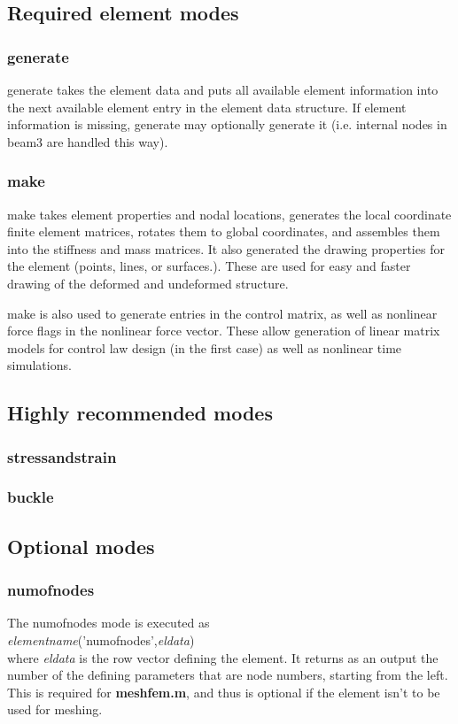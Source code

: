 \documentclass[12pt]{article}
\newcommand*{\command}[1]{\textsf{#1}}
\newcommand*{\filename}[1]{\textsf{\textbf{#1}}}
\newcommand*{\varg}[1]{\textit{#1}}
\begin{document}
\subsection{Required element modes}
\subsubsection{\command{generate}}
\command{generate} takes the element data and puts all available
element information into the next available element entry in the
element data structure. If element information is missing, generate
may optionally generate it (i.e. internal nodes in \command{beam3} are
handled this way).
\subsubsection{\command{make}}
\command{make} takes element properties and nodal locations, generates
the local coordinate finite element matrices, rotates them to global
coordinates, and assembles them into the stiffness and mass matrices.
It also generated the drawing properties for the element (points,
lines, or surfaces.). These are used for easy and faster drawing of
the deformed and undeformed structure.

\command{make} is also used to generate entries in the control matrix,
as well as nonlinear force flags in the nonlinear force vector. These
allow generation of linear matrix models for control law design (in
the first case) as well as nonlinear time simulations.
\subsection{Highly recommended modes}
\subsubsection{\command{stressandstrain}}
\subsubsection{\command{buckle}}
\subsection{Optional modes}
\subsubsection{numofnodes}
The \command{numofnodes} mode is executed as\\
\varg{elementname}\command{('numofnodes',}\varg{eldata}\command{)}\\
where \varg{eldata} is the row vector defining the element. It returns
as an output the number of the defining parameters that are node
numbers, starting from the left. This is required for
\filename{meshfem.m}, and thus is optional if the element isn't to be
used for meshing.
\end{document}
